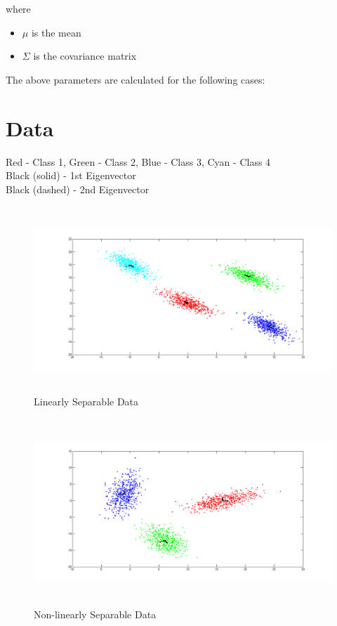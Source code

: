 \documentclass[11pt,a4paper]{article}
\begin{document}
 where
 \begin{itemize}
 	\item $\mu$ is the mean 
 	\item $\Sigma$ is the covariance matrix
 \end{itemize}
 
 The above parameters are calculated for the following cases:
\section{Data}
Red - Class 1, Green - Class 2, Blue - Class 3, Cyan - Class 4\\
Black (solid) - 1st Eigenvector\\
Black (dashed) - 2nd Eigenvector\\  
\begin{figure}[H]
		\centering
\includegraphics[height=7cm]{Figures/ls_eig.png}
\caption{Linearly Separable Data}
\end{figure}

\begin{figure}[H]
		\centering
\includegraphics[height=7cm]{Figures/NLS_eig.png}
\caption{Non-linearly Separable Data}
\end{figure}
\end{document}
